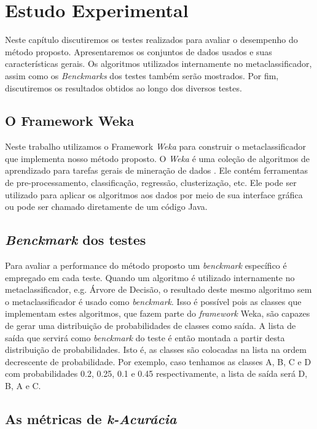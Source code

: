 \chapter{Estudo Experimental}
\label{chap:descricaodostestes}

Neste capítulo discutiremos os testes realizados para avaliar o desempenho do método proposto.
Apresentaremos os conjuntos de dados usados e suas características gerais. 
Os algoritmos utilizados internamente no metaclassificador, assim como os \textit{Benckmarks} dos testes também serão mostrados.
Por fim, discutiremos os resultados obtidos ao longo dos diversos testes.

\section{O Framework Weka}

Neste trabalho utilizamos o Framework \textit{Weka} para construir o metaclassificador que implementa nosso método proposto. 
O \textit{Weka} é uma coleção de algoritmos de aprendizado para tarefas gerais de mineração de dados \cite{Hall}.
Ele contém ferramentas de pre-processamento, classificação, regressão, clusterização, etc.
Ele pode ser utilizado para aplicar os algoritmos aos dados por meio de sua interface gráfica ou pode ser chamado diretamente de um código Java.

\section{\textit{Benckmark} dos testes}

Para avaliar a performance do método proposto um \textit{benckmark} específico é empregado em cada teste.
Quando um algoritmo é utilizado internamente no metaclassificador, e.g. Árvore de Decisão, o resultado deste mesmo algoritmo sem o metaclassificador é usado como \textit{benckmark}.
Isso é possível pois as classes que implementam estes algoritmos, que fazem parte do \textit{framework} Weka, são capazes de gerar uma distribuição de probabilidades de classes como saída.
A lista de saída que servirá como \textit{benckmark} do teste é então montada a partir desta distribuição de probabilidades.
Isto é, as classes são colocadas na lista na ordem decrescente de probabilidade.
Por exemplo, caso tenhamos as classes A, B, C e D com probabilidades 0.2, 0.25, 0.1 e 0.45 respectivamente, a lista de saída será D, B, A e C.

\section{As métricas de \textit{k-Acurácia}}

